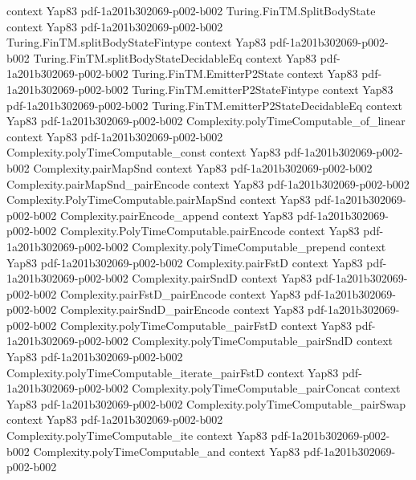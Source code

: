 \begin{theorem}
  {context}
  {Yap83}
  {pdf-1a201b302069-p002-b002}
\proofstep
  {Turing.FinTM.SplitBodyState}
  {context}
  {Yap83}
  {pdf-1a201b302069-p002-b002}
\proofstep
  {Turing.FinTM.splitBodyStateFintype}
  {context}
  {Yap83}
  {pdf-1a201b302069-p002-b002}
\proofstep
  {Turing.FinTM.splitBodyStateDecidableEq}
  {context}
  {Yap83}
  {pdf-1a201b302069-p002-b002}
\proofstep
  {Turing.FinTM.EmitterP2State}
  {context}
  {Yap83}
  {pdf-1a201b302069-p002-b002}
\proofstep
  {Turing.FinTM.emitterP2StateFintype}
  {context}
  {Yap83}
  {pdf-1a201b302069-p002-b002}
\proofstep
  {Turing.FinTM.emitterP2StateDecidableEq}
  {context}
  {Yap83}
  {pdf-1a201b302069-p002-b002}
\proofstep
  {Complexity.polyTimeComputable_of_linear}
  {context}
  {Yap83}
  {pdf-1a201b302069-p002-b002}
\proofstep
  {Complexity.polyTimeComputable_const}
  {context}
  {Yap83}
  {pdf-1a201b302069-p002-b002}
\proofstep
  {Complexity.pairMapSnd}
  {context}
  {Yap83}
  {pdf-1a201b302069-p002-b002}
\proofstep
  {Complexity.pairMapSnd_pairEncode}
  {context}
  {Yap83}
  {pdf-1a201b302069-p002-b002}
\proofstep
  {Complexity.PolyTimeComputable.pairMapSnd}
  {context}
  {Yap83}
  {pdf-1a201b302069-p002-b002}
\proofstep
  {Complexity.pairEncode_append}
  {context}
  {Yap83}
  {pdf-1a201b302069-p002-b002}
\proofstep
  {Complexity.PolyTimeComputable.pairEncode}
  {context}
  {Yap83}
  {pdf-1a201b302069-p002-b002}
\proofstep
  {Complexity.polyTimeComputable_prepend}
  {context}
  {Yap83}
  {pdf-1a201b302069-p002-b002}
\proofstep
  {Complexity.pairFstD}
  {context}
  {Yap83}
  {pdf-1a201b302069-p002-b002}
\proofstep
  {Complexity.pairSndD}
  {context}
  {Yap83}
  {pdf-1a201b302069-p002-b002}
\proofstep
  {Complexity.pairFstD_pairEncode}
  {context}
  {Yap83}
  {pdf-1a201b302069-p002-b002}
\proofstep
  {Complexity.pairSndD_pairEncode}
  {context}
  {Yap83}
  {pdf-1a201b302069-p002-b002}
\proofstep
  {Complexity.polyTimeComputable_pairFstD}
  {context}
  {Yap83}
  {pdf-1a201b302069-p002-b002}
\proofstep
  {Complexity.polyTimeComputable_pairSndD}
  {context}
  {Yap83}
  {pdf-1a201b302069-p002-b002}
\proofstep
  {Complexity.polyTimeComputable_iterate_pairFstD}
  {context}
  {Yap83}
  {pdf-1a201b302069-p002-b002}
\proofstep
  {Complexity.polyTimeComputable_pairConcat}
  {context}
  {Yap83}
  {pdf-1a201b302069-p002-b002}
\proofstep
  {Complexity.polyTimeComputable_pairSwap}
  {context}
  {Yap83}
  {pdf-1a201b302069-p002-b002}
\proofstep
  {Complexity.polyTimeComputable_ite}
  {context}
  {Yap83}
  {pdf-1a201b302069-p002-b002}
\proofstep
  {Complexity.polyTimeComputable_and}
  {context}
  {Yap83}
  {pdf-1a201b302069-p002-b002}

\end{theorem}
